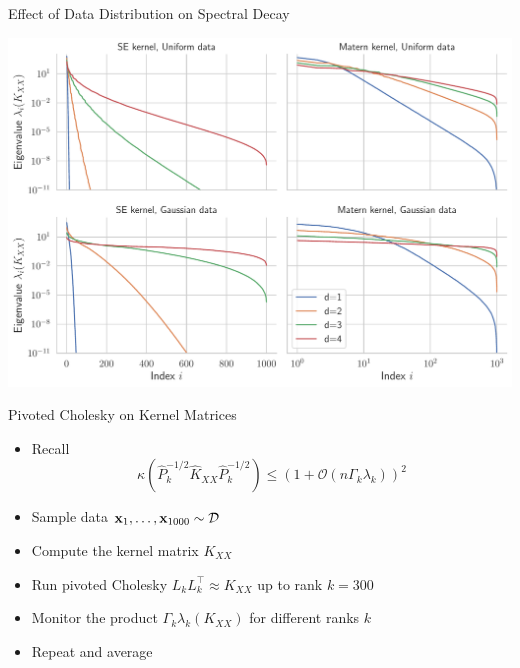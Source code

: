 \documentclass{beamer}
\begin{document}
\begin{frame}{Effect of Data Distribution on Spectral Decay}
\begin{center}
    \includegraphics[width=\textwidth]{report/res/kernel_eigvals.pdf}
\end{center}
\end{frame}


\begin{frame}{Pivoted Cholesky on Kernel Matrices}
\begin{itemize}[<+->]
    \item Recall 
    \begin{equation*}
        \kappa \left( \widehat P_k^{- 1/ 2} \widehat K_{XX} \widehat P_k^{- 1/2} \right) \le (1 + \mathcal O(n\Gamma_k \lambda_k) )^2
    \end{equation*}
    \item Sample data $\boldsymbol{\mathbf{x}}_1, \ldots, \boldsymbol{\mathbf{x}}_{1000} \sim \mathcal D$
    \item Compute the kernel matrix $K_{XX}$
    \item Run pivoted Cholesky $L_kL_k^\top \approx K_{XX}$ up to rank $k=300$
    \item Monitor the product $\Gamma_k \lambda_k(K_{XX})$ for different ranks $k$
    \item Repeat and average
    
\end{itemize}
\end{frame}
\end{document}

